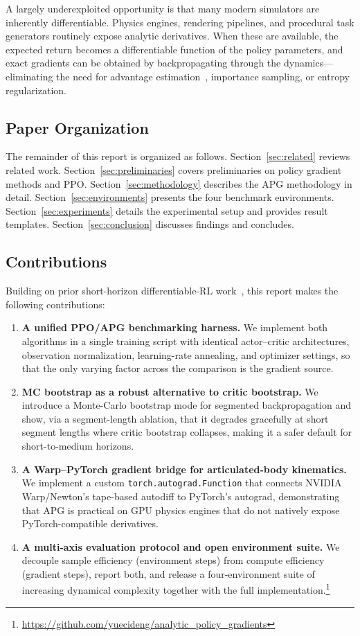 \documentclass[11pt,a4paper]{article}
\begin{document}
A largely underexploited opportunity is that many modern simulators are inherently differentiable. Physics engines, rendering pipelines, and procedural task generators routinely expose analytic derivatives. When these are available, the expected return becomes a differentiable function of the policy parameters, and exact gradients can be obtained by backpropagating through the dynamics—eliminating the need for advantage estimation~\cite{schulman2016gae}, importance sampling, or entropy regularization.

\subsection{Paper Organization}
\label{sec:organization}

The remainder of this report is organized as follows. Section~\ref{sec:related} reviews related work. Section~\ref{sec:preliminaries} covers preliminaries on policy gradient methods and PPO. Section~\ref{sec:methodology} describes the APG methodology in detail. Section~\ref{sec:environments} presents the four benchmark environments. Section~\ref{sec:experiments} details the experimental setup and provides result templates. Section~\ref{sec:conclusion} discusses findings and concludes.

\subsection{Contributions}
\label{sec:contributions}
Building on prior short-horizon differentiable-RL work~\cite{guo2023shac,xu2022accelerated}, this report makes the following contributions:
\begin{enumerate}
  \item \textbf{A unified PPO/APG benchmarking harness.} We implement both algorithms in a single training script with identical actor--critic architectures, observation normalization, learning-rate annealing, and optimizer settings, so that the only varying factor across the comparison is the gradient source.
  \item \textbf{MC bootstrap as a robust alternative to critic bootstrap.} We introduce a Monte-Carlo bootstrap mode for segmented backpropagation and show, via a segment-length ablation, that it degrades gracefully at short segment lengths where critic bootstrap collapses, making it a safer default for short-to-medium horizons.
  \item \textbf{A Warp--PyTorch gradient bridge for articulated-body kinematics.} We implement a custom \texttt{torch.autograd.Function} that connects NVIDIA Warp/Newton's tape-based autodiff to PyTorch's autograd, demonstrating that APG is practical on GPU physics engines that do not natively expose PyTorch-compatible derivatives.
  \item \textbf{A multi-axis evaluation protocol and open environment suite.} We decouple sample efficiency (environment steps) from compute efficiency (gradient steps), report both, and release a four-environment suite of increasing dynamical complexity together with the full implementation.\footnote{\url{https://github.com/yuecideng/analytic_policy_gradients}}
\end{enumerate}
\end{document}
